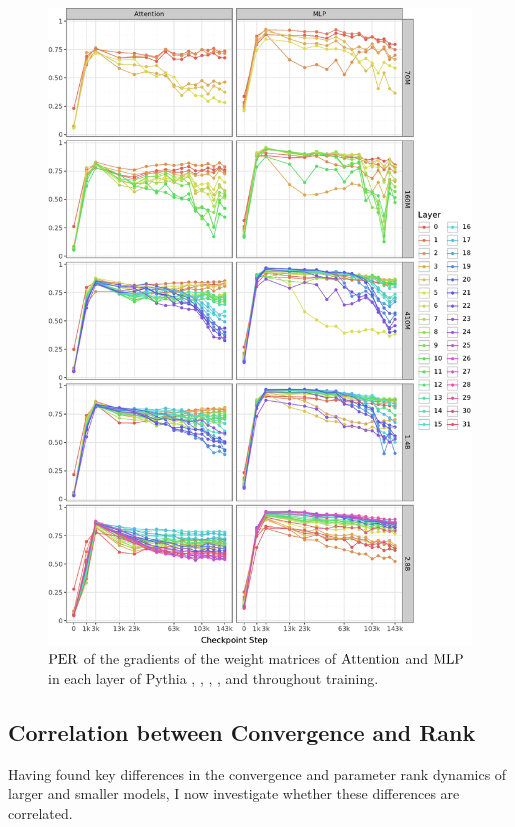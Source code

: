 \begin{figure}[h!]
    \centering
    \includegraphics[width=0.9\linewidth]{chapters/tending-towards-stability/figures/per_grad_lines.pdf}
    \vspace{-5pt}
    \caption{$\mathrm{PER}$ of the gradients of the weight matrices of $\mathrm{Attention}$ and $\mathrm{MLP}$ in each layer of Pythia \sevenmil, \sixmil, \fourmil, \onebil, and \twobil throughout training.}%
    \label{fig:per_grad-layer-wise-lines}
\end{figure}
\clearpage

\subsection{Correlation between Convergence and Rank}
\label{subsec:correlation-cka-per}

Having found key differences in the convergence and parameter rank dynamics of larger and smaller models, I now investigate whether these differences are correlated. 



